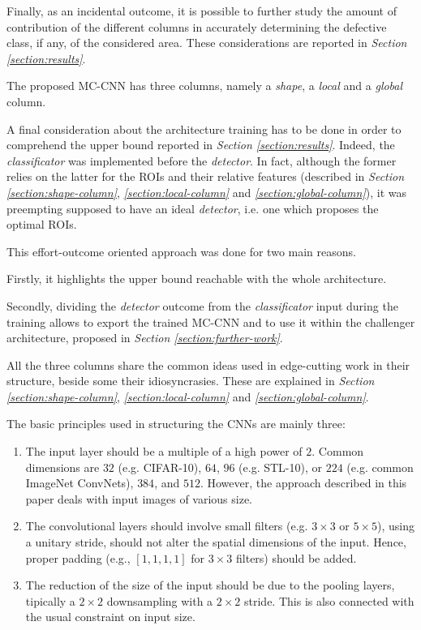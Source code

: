     \par{
        Finally, as an incidental outcome, it is possible to further study the amount of contribution of the different columns in accurately determining the defective class, if any, of the considered area. These considerations are reported in \emph{Section \ref{section:results}}.
    }
    \par{
        The proposed MC-CNN has three columns, namely a \emph{shape}, a \emph{local} and a \emph{global} column.
    }
    \par{
        A final consideration about the architecture training has to be done in order to comprehend the upper bound reported in \emph{Section \ref{section:results}}. Indeed, the \emph{classificator} was implemented before the \emph{detector}. In fact, although the former relies on the latter for the ROIs and their relative features (described in \emph{Section \ref{section:shape-column}}, \emph{\ref{section:local-column}} and \emph{\ref{section:global-column}}), it was preempting supposed to have an ideal \emph{detector}, i.e. one which proposes the optimal ROIs.
    }
    \par{
        This effort-outcome oriented approach was done for two main reasons.
    }
    \par{
        Firstly, it highlights the upper bound reachable with the whole architecture.
    }
    \par{
        Secondly, dividing the \emph{detector} outcome from the \emph{classificator} input during the training allows to export the trained MC-CNN and to use it within the challenger architecture, proposed in \emph{Section \ref{section:further-work}}.
    }
    \par{
        All the three columns share the common ideas used in edge-cutting work \cite{stanford:cs231n} in their structure, beside some their idiosyncrasies. These are explained in \emph{Section \ref{section:shape-column}}, \emph{\ref{section:local-column}} and \emph{\ref{section:global-column}}.
    }
    \par{
        The basic principles used in structuring the CNNs are mainly three:
        \begin{enumerate}
            \item The input layer should be a multiple of a high power of $2$. Common dimensions are $32$ (e.g. CIFAR-10), $64$, $96$ (e.g. STL-10), or $224$ (e.g. common ImageNet ConvNets), $384$, and $512$. However, the approach described in this paper deals with input images of various size.
            \item The convolutional layers should involve small filters (e.g. $3\times 3$ or $5\times5$), using a unitary stride, should not alter the spatial dimensions of the input. Hence, proper padding (e.g., $\left[1,1,1,1\right]$ for $3\times 3$ filters) should be added.
            \item The reduction of the size of the input should be due to the pooling layers, tipically a $2\times 2$ downsampling with a $2\times 2$ stride. This is also connected with the usual constraint on input size.
        \end{enumerate}
    }
